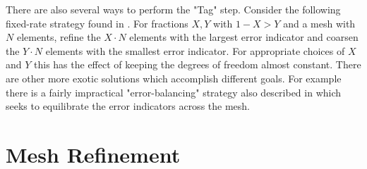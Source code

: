 \documentclass[12 pt]{report}
\begin{document}
There are also several ways to perform the "Tag" step. Consider the following fixed-rate strategy found in \citet[Chapter 4]{bangerth_adaptive_2003}. For fractions $X, Y$ with $1 - X > Y$ and a mesh with $N$ elements, refine the $X\cdot N$ elements with the largest error indicator and coarsen the $Y\cdot N$ elements with the smallest error indicator. For appropriate choices of $X$ and $Y$ this has the effect of keeping the degrees of freedom almost constant. There are other more exotic solutions which accomplish different goals. For example there is a fairly impractical "error-balancing" strategy also described in \citet[Chapter 4]{bangerth_adaptive_2003} which seeks to equilibrate the error indicators across the mesh.

\section{Mesh Refinement}
\end{document}
